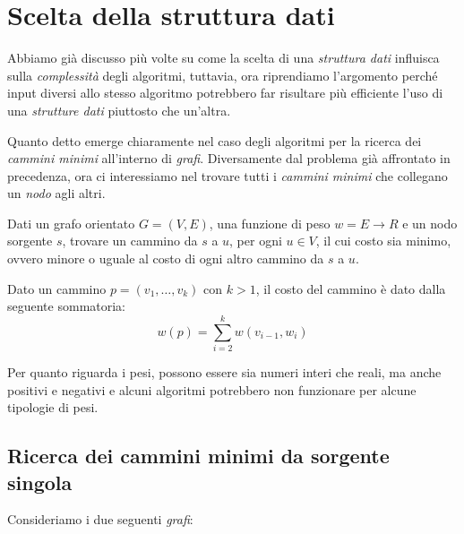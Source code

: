 \chapter{Scelta della struttura dati}
Abbiamo già discusso più volte su come la scelta di una \emph{struttura dati}
influisca sulla \emph{complessità} degli algoritmi, tuttavia, ora riprendiamo
l'argomento perché input diversi allo stesso algoritmo potrebbero far risultare
più efficiente l'uso di una \emph{strutture dati} piuttosto che un'altra.

Quanto detto emerge chiaramente nel caso degli algoritmi per la ricerca dei
\emph{cammini minimi} all'interno di \emph{grafi}. Diversamente dal problema
già affrontato in precedenza, ora ci interessiamo nel trovare tutti
i \emph{cammini minimi} che collegano un \emph{nodo} agli altri.

\begin{problem}
    Dati un grafo orientato $G=(V,E)$, una funzione di peso $w=E\to R$ e un
    nodo sorgente $s$, trovare un cammino da $s$ a $u$, per ogni $u\in V$, il
    cui costo sia minimo, ovvero minore o uguale al costo di ogni altro cammino
    da $s$ a $u$.
\end{problem}
\begin{definition}
    Dato un cammino $p=\left(v_1,\dots,v_k\right)$ con $k>1$, il costo del
    cammino è dato dalla seguente sommatoria:
    \[w(p)=\sum_{i=2}^k w(v_{i-1},w_i)\]
\end{definition}\noindent
Per quanto riguarda i pesi, possono essere sia numeri interi che reali, ma anche
positivi e negativi e alcuni algoritmi potrebbero non funzionare per alcune
tipologie di pesi.

\section{Ricerca dei cammini minimi da sorgente singola}
Consideriamo i due seguenti \emph{grafi}:


